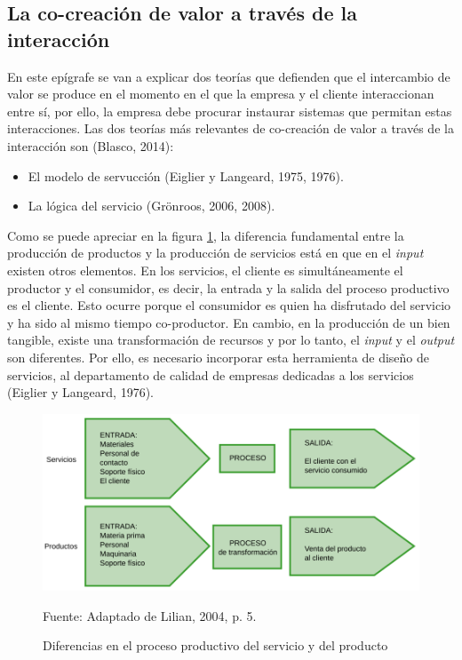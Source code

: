 \subsection{La co-creación de valor a través de la interacción}

En este epígrafe se van a explicar dos teorías que defienden que el intercambio de valor se produce en el momento en el que la empresa y el cliente interaccionan entre sí, por ello, la empresa debe procurar instaurar sistemas que permitan estas interacciones. Las dos teorías más relevantes de co-creación de valor a través de la interacción son (Blasco, 2014):

\begin{itemize} 
    \item El modelo de servucción (Eiglier y Langeard, 1975, 1976). 
    \item La lógica del servicio (Grönroos, 2006, 2008). 
\end{itemize}

Como se puede apreciar en la figura \ref{fig:procesoProductivoEiglier}, la diferencia fundamental entre la producción de productos y la producción de servicios está en que en el \emph{input} existen otros elementos. En los servicios, el cliente es simultáneamente el productor y el consumidor, es decir, la entrada y la salida del proceso productivo es el cliente. Esto ocurre porque el consumidor es quien ha disfrutado del servicio y ha sido al mismo tiempo co-productor. En cambio, en la producción de un bien tangible, existe una transformación de recursos y por lo tanto, el \emph{input} y el \emph{output} son diferentes. Por ello, es necesario incorporar esta herramienta de diseño de servicios, al departamento de calidad de empresas dedicadas a los servicios (Eiglier y Langeard, 1976). 

\begin{figure}[!h]
	\caption{Diferencias en el proceso productivo del servicio y del producto}
	\centering \includegraphics[width=150mm]{capitulos/graficos/procesoProductivoEiglier} 
	\label{fig:procesoProductivoEiglier} 

	\footnotesize
		Fuente: Adaptado de Lilian, 2004, p. 5.
\end{figure}

